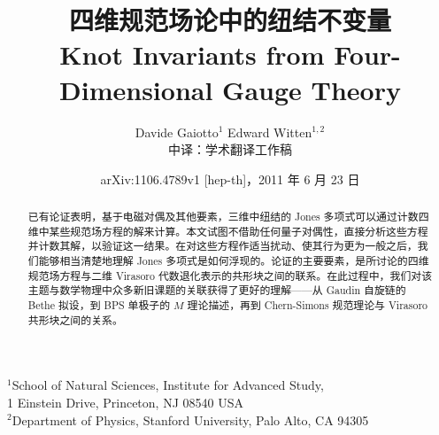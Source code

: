 \title{\bfseries 四维规范场论中的纽结不变量\\[6pt]
       \large Knot Invariants from Four-Dimensional Gauge Theory}
\author{Davide Gaiotto$^{1}$ \quad Edward Witten$^{1,2}$\\[4pt]
        \small 中译：学术翻译工作稿}
\date{arXiv:1106.4789v1 [hep-th]，2011 年 6 月 23 日}
\maketitle

\begin{center}
\small
$^1$School of Natural Sciences, Institute for Advanced Study,\\
1 Einstein Drive, Princeton, NJ 08540 USA\\
$^2$Department of Physics, Stanford University, Palo Alto, CA 94305
\end{center}

\vspace{1em}

\begin{abstract}
\noindent
已有论证表明，基于电磁对偶及其他要素，三维中纽结的 Jones 多项式可以通过计数四维中某些规范场方程的解来计算。本文试图不借助任何量子对偶性，直接分析这些方程并计数其解，以验证这一结果。在对这些方程作适当扰动、使其行为更为一般之后，我们能够相当清楚地理解 Jones 多项式是如何浮现的。论证的主要要素，是所讨论的四维规范场方程与二维 Virasoro 代数退化表示的共形块之间的联系。在此过程中，我们对该主题与数学物理中众多新旧课题的关联获得了更好的理解——从 Gaudin 自旋链的 Bethe 拟设，到 BPS 单极子的 $M$ 理论描述，再到 Chern-Simons 规范理论与 Virasoro 共形块之间的关系。
\end{abstract}

\newpage

\vspace{0.5em}

